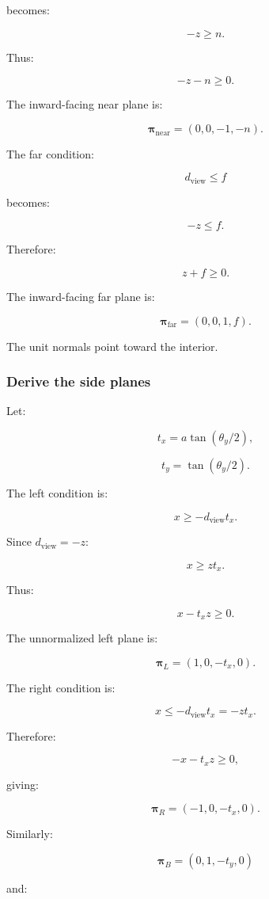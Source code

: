becomes:

\[
 -z\ge n.
\]

Thus:

\[
 \boxed{ -z-n\ge0 }.
\]

The inward-facing near plane is:

\[
 \boxed{ \boldsymbol\pi_{\mathrm{near}}=(0,0,-1,-n) }.
\]

The far condition:

\[
 d_{\mathrm{view}}\le f
\]

becomes:

\[
 -z\le f.
\]

Therefore:

\[
 \boxed{ z+f\ge0 }.
\]

The inward-facing far plane is:

\[
 \boxed{ \boldsymbol\pi_{\mathrm{far}}=(0,0,1,f) }.
\]

The unit normals point toward the interior.

\subsubsection{Derive the side planes}\label{derive-the-side-planes}

Let:

\[
 t_x=a\tan(\theta_y/2),
\]

\[
 t_y=\tan(\theta_y/2).
\]

The left condition is:

\[
 x\ge-d_{\mathrm{view}}t_x.
\]

Since \(d_{\mathrm{view}}=-z\):

\[
 x\ge zt_x.
\]

Thus:

\[
 \boxed{x-t_xz\ge0}.
\]

The unnormalized left plane is:

\[
 \boxed{ \boldsymbol\pi_L=(1,0,-t_x,0) }.
\]

The right condition is:

\[
 x\le-d_{\mathrm{view}}t_x=-zt_x.
\]

Therefore:

\[
 \boxed{-x-t_xz\ge0},
\]

giving:

\[
 \boxed{ \boldsymbol\pi_R=(-1,0,-t_x,0) }.
\]

Similarly:

\[
 \boxed{ \boldsymbol\pi_B=(0,1,-t_y,0) }
\]

and:

